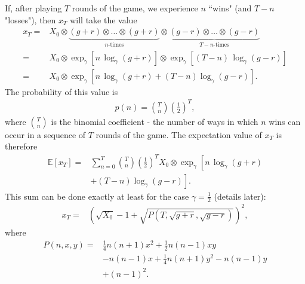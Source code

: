 \documentclass[11pt]{article}
\begin{document}
\begin{multicols}{2}
If, after playing $T$ rounds of the game, we experience $n$ ``wins" (and $T-n$ "losses"), then $x_T$ will take the value
\begin{align*}
x_T =  &X_0\otimes \underbrace{(g+r)\otimes \ldots \otimes (g+r)}_{n\text{-times}} \otimes \underbrace{(g-r)\otimes \ldots \otimes (g-r)}_{T-n\text{-times}} \\
=& X_0\otimes\exp_\gamma\left[n\,\log_\gamma(g+r)\right] \otimes \exp_\gamma\left[(T-n)\,\log_\gamma(g-r) \right]\\
=& X_0\otimes \exp_\gamma\left[ n\,\log_\gamma(g+r) + (T-n)\log_\gamma(g-r) \right].
\end{align*}
The probability of this value is
\begin{align}
\label{eq:binomialDistr}
p(n) = {T \choose n} \left(\frac{1}{2}\right)^T,
\end{align}
where ${T \choose n}$ is the binomial coefficient -  the number of ways in which $n$ wins can occur in a sequence of $T$ rounds of the game.
The expectation value of $x_T$ is therefore
\begin{align}
\label{eq-expectationxT}\mathbb{E}\left[x_T \right] =& \sum_{n=0}^T  {T \choose n} \left(\frac{1}{2}\right)^T  X_0\otimes\exp_\gamma\left[ n\,\log_\gamma(g+r) \right.\\
\nonumber & \left. + (T-n)\log_\gamma(g-r) \right].
\end{align}
This sum can be done exactly at least for the case $\gamma = \frac{1}{2}$ (details later):
\begin{align}
x_T =& \left(\sqrt{X_0}-1 +\sqrt{P(T, \sqrt{g+r}, \sqrt{g-r})} \right)^2,
\end{align}
where
\begin{align*}
P(n, x, y) =& \frac{1}{4} n (n+1) x^2+\frac{1}{2} n (n-1) x y\\
& -n (n-1) x+\frac{1}{4} n (n+1) y^2-n (n-1) y\\
& +(n-1)^2.
\end{align*}




\end{multicols}
\end{document}
